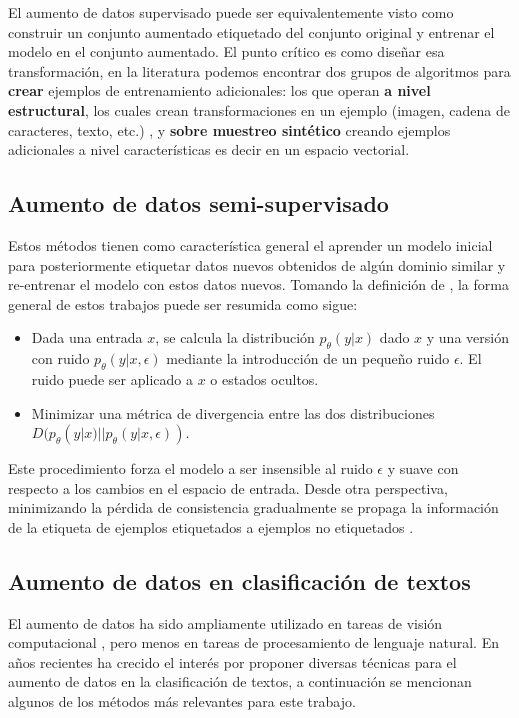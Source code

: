 El aumento de datos supervisado puede ser equivalentemente visto como construir un conjunto aumentado etiquetado del conjunto original y entrenar el modelo en el conjunto aumentado. El punto crítico es como diseñar esa transformación, en la literatura podemos encontrar dos grupos de algoritmos para \textbf{crear} ejemplos de entrenamiento adicionales: los que operan \textbf{a nivel estructural}, los cuales crean transformaciones en un ejemplo (imagen, cadena de caracteres, texto, etc.) \citep{zhong2017random}, y \textbf{sobre muestreo sintético} creando ejemplos adicionales a nivel características es decir en un espacio vectorial\citep{chawla2002smote}. 

\subsection{Aumento de datos semi-supervisado}

Estos métodos tienen como característica general el aprender un modelo inicial para posteriormente etiquetar datos nuevos obtenidos de algún dominio similar y re-entrenar el modelo con estos datos nuevos. Tomando la definición de \citep{xie2019unsupervised}, la forma general de estos trabajos puede ser resumida como sigue:

\begin{itemize}
    \item Dada una entrada $x$, se calcula la distribución $p_\theta (y|x)$ dado $x$ y una versión con ruido $p_\theta (y|x, \epsilon)$ mediante la introducción de un pequeño ruido $\epsilon$. El ruido puede ser aplicado a $x$ o estados ocultos.
    \item Minimizar una métrica de divergencia entre las dos distribuciones $D (p_\theta (y|x) || p_\theta (y|x, \epsilon))$.
\end{itemize}

Este procedimiento forza el modelo a ser insensible al ruido $\epsilon$ y suave con respecto a los cambios en el espacio de entrada. Desde otra perspectiva, minimizando la pérdida de consistencia gradualmente se propaga la información de la etiqueta de ejemplos etiquetados a ejemplos no etiquetados \citep{Miyato2019}.


\subsection{Aumento de datos en clasificación de textos}

El aumento de datos ha sido ampliamente utilizado en tareas de visión computacional \citep{cubuk2019autoaugment}, pero menos en tareas de procesamiento de lenguaje natural. En años recientes ha crecido el interés por proponer diversas técnicas para el aumento de datos en la clasificación de textos, a continuación se mencionan algunos de los métodos más relevantes para este trabajo.

